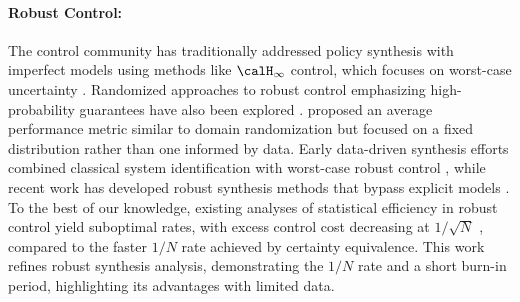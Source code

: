 \paragraph{Robust Control:} The control community has traditionally addressed policy synthesis with imperfect models using methods like $\calH_\infty$ control, which focuses on worst-case uncertainty \citep{zhou1996robust, bacsar2008h, doyle1982analysis, fan1991robustness}. Randomized approaches to robust control emphasizing high-probability guarantees have also been explored \citep{calafiore2006scenario, stengel1991technical, ray1993monte}. \citet{vidyasagar2001randomized} proposed an average performance metric similar to domain randomization but focused on a fixed distribution rather than one informed by data. Early data-driven synthesis efforts combined classical system identification \citep{ljung1998system} with worst-case robust control \citep{gevers2005identification}, while recent work has developed robust synthesis methods that bypass explicit models \citep{berberich2020robust}. To the best of our knowledge, existing analyses of statistical efficiency in robust control yield suboptimal rates, with excess control cost decreasing at $1/\sqrt{N}$ \citep{dean2020sample}, compared to the faster $1/N$ rate achieved by certainty equivalence. This work refines robust synthesis analysis, demonstrating the $1/N$ rate and a short burn-in period, highlighting its advantages with limited data.

